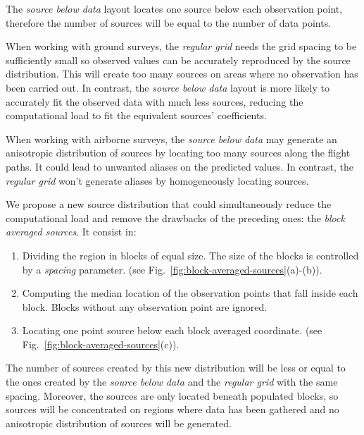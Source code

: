 \documentclass[twocolumn]{article}
\begin{document}
The \emph{source below data} layout locates one source below each
observation point, therefore the number of sources will be equal to the number
of data points.

When working with ground surveys, the \emph{regular grid} needs the grid
spacing to be sufficiently small so observed values can be accurately
reproduced by the source distribution.
This will create too many sources on areas where no observation has been
carried out.
In contrast, the \emph{source below data} layout is more likely to accurately
fit the observed data with much less sources, reducing the computational load
to fit the equivalent sources' coefficients.

When working with airborne surveys, the \emph{source below data} may
generate an anisotropic distribution of sources by locating too many sources
along the flight paths.
It could lead to unwanted aliases on the predicted values.
In contrast, the \emph{regular grid} won't generate aliases by homogeneously
locating sources.

We propose a new source distribution that could simultaneously reduce the
computational load and remove the drawbacks of the preceding ones: the
\emph{block averaged sources}.
It consist in:

\begin{enumerate}
    \item Dividing the region in blocks of equal size. The size of the blocks
        is controlled by a \emph{spacing} parameter.
        (see Fig.~\ref{fig:block-averaged-sources}(a)-(b)).
    \item Computing the median location of the observation points that fall
        inside each block. Blocks without any observation point are ignored.
    \item Locating one point source below each block averaged coordinate.
        (see Fig.~\ref{fig:block-averaged-sources}(c)).
\end{enumerate}

The number of sources created by this new distribution will be less or equal to
the ones created by the \emph{source below data} and the \emph{regular
grid} with the same spacing.
Moreover, the sources are only located beneath populated blocks, so sources
will be concentrated on regions where data has been gathered and no anisotropic
distribution of sources will be generated.
\end{document}
